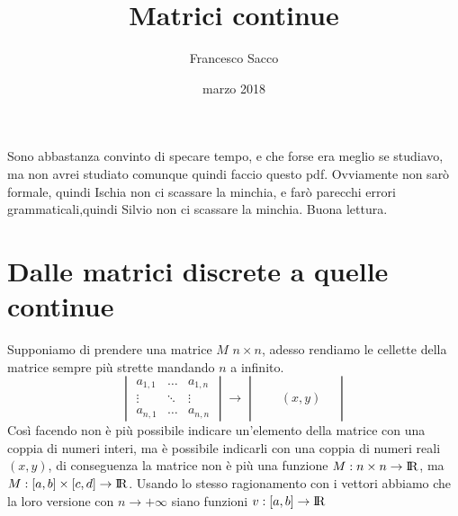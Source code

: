 \documentclass[11pt,a4paper]{article}
\date{marzo 2018}
\title{Matrici continue}
\author{Francesco Sacco}
\begin{document}
	\maketitle
		Sono abbastanza convinto di specare tempo, e che forse era meglio se studiavo, ma non avrei studiato comunque quindi faccio questo pdf.\newline
		Ovviamente non sarò formale, quindi Ischia non ci scassare la minchia, e farò parecchi errori grammaticali,quindi Silvio non ci scassare la minchia.
		Buona lettura.
		\section{Dalle matrici discrete a quelle continue}
			Supponiamo di prendere una matrice $M$ $ n \times n$, adesso rendiamo le cellette della matrice sempre più strette mandando $n$ a infinito.
			\begin{equation}
				\begin{vmatrix}
					a_{1,1} & \dots & a_{1,n} \\
					\vdots	&	\ddots&	\vdots	\\
					a_{n,1} & \dots & a_{n,n} 
				\end{vmatrix}
				\longrightarrow
				\begin{vmatrix}
					& & & \\
					& & & \\
					& & (x,y) & \\
					& & & \\
				\end{vmatrix}
			\end{equation}
			Così facendo non è più possibile indicare un'elemento della matrice con una coppia di numeri interi, ma è possibile indicarli con una coppia di numeri reali $(x,y)$, di  conseguenza la matrice non è più una funzione $M:n\times n \rightarrow \rm I\!R$, ma $M:[a,b]\times [c,d]\rightarrow \rm I\!R$.\newline
			Usando lo stesso ragionamento con i vettori abbiamo che la loro versione con $n\rightarrow +\infty$ siano funzioni $v:[a,b]\rightarrow \rm I\!R$ 
\end{document}
